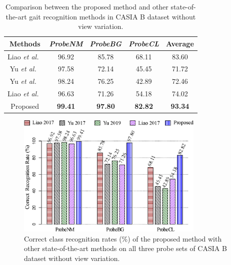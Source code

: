 \begin{table}[t]
	\centering
	\caption [Comparison between the proposed method and other state-of-the-art gait recognition methods in CASIA B dataset without view variation]
	{Comparison between the proposed method and other state-of-the-art gait recognition methods in CASIA B dataset without view variation. \label{table:comp_casia_b_without_view}}
	
	{\begin{tabular*}{25pc}{ccccc}\hline
			
			Methods &\textit{ProbeNM} &\textit{ProbeBG} &\textit{ProbeCL} &Average\\
			\hline
			
			Liao \textit{et al.}~\cite{Liao_17} &96.92 &85.78 &68.11 &83.60 \\ 
			
			\noalign{\smallskip}
			Yu \textit{et al.}~\cite{Yu_17_spae}  &97.58  &72.14 &45.45 &71.72 \\
			
			\noalign{\smallskip}
			Yu \textit{et al.}~\cite{Yu_19} &98.24  &76.25  &42.89  &72.46 \\
			
			\noalign{\smallskip}
			Liao \textit{et al.}~\cite{Liao_19}  &96.63  &71.26  &54.18  &74.02 \\
			
			\noalign{\smallskip}
			Proposed &\textbf{99.41} &\textbf{97.80} &\textbf{82.82} &\textbf{93.34} \\
			\hline
	\end{tabular*}}{}
\end{table}

\begin{figure}
	\centering
	\includegraphics[width = 0.8\textwidth]{figures/comp_casia_b_without_view.eps}
	\caption [Correct class recognition rates (\%) of the proposed method with other state-of-the-art methods on all three probe sets of CASIA B dataset without view variation] 
	{Correct class recognition rates (\%) of the proposed method with other state-of-the-art methods on all three probe sets of CASIA B dataset without view variation.  \label{fig:comp_casia_b_without_view}
	}
\end{figure}


